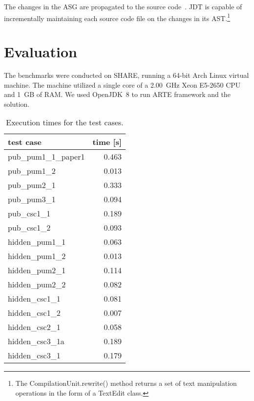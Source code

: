 \documentclass[submission,copyright,creativecommons]{eptcs}
\begin{document}

The changes in the ASG are propagated to the source code~. JDT is capable of incrementally maintaining each source code file on the changes in its AST.\footnote{The \textsf{CompilationUnit.rewrite()} method returns a set of text manipulation operations in the form of a \textsf{TextEdit} class.}

\section{Evaluation}

The benchmarks were conducted on SHARE, running a 64-bit Arch Linux virtual machine. The machine utilized a single core of a 2.00~GHz Xeon E5-2650 CPU and 1~GB of RAM. We used OpenJDK~8 to run ARTE framework and the solution.

\begin{table}[!htb]
\centering
\footnotesize
\begin{tabular}{| l | r |}
\hline
\bf test case & \bf time [s]\\\hline\hline
\sf pub\_pum1\_1\_paper1 & 0.463 \\\hline
\sf pub\_pum1\_2 & 0.013 \\\hline
\sf pub\_pum2\_1 & 0.333 \\\hline
\sf pub\_pum3\_1 & 0.094 \\\hline
\sf pub\_csc1\_1 & 0.189 \\\hline
\sf pub\_csc1\_2 & 0.093 \\\hline
\sf hidden\_pum1\_1 & 0.063 \\\hline
\sf hidden\_pum1\_2 & 0.013 \\\hline
\sf hidden\_pum2\_1 & 0.114 \\\hline
\sf hidden\_pum2\_2 & 0.082 \\\hline
\sf hidden\_csc1\_1 & 0.081 \\\hline
\sf hidden\_csc1\_2 & 0.007 \\\hline
\sf hidden\_csc2\_1 & 0.058 \\\hline
\sf hidden\_csc3\_1a & 0.189 \\\hline
\sf hidden\_csc3\_1 & 0.179 \\\hline

\end{tabular}\caption{Execution times for the test cases.}
\label{tab:execution-times}
\end{table}
\end{document}
